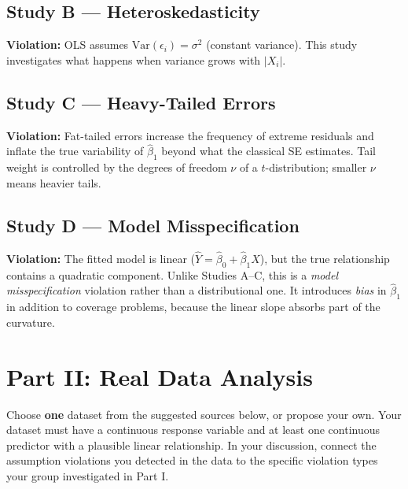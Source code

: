 \documentclass[12pt]{article}
\begin{document}
\subsection*{Study B --- Heteroskedasticity}

\textbf{Violation:} OLS assumes $\mathrm{Var}(\epsilon_i) = \sigma^2$ (constant variance). This study investigates what happens when variance grows with $|X_i|$.

\subsection*{Study C --- Heavy-Tailed Errors}

\textbf{Violation:} Fat-tailed errors increase the frequency of extreme residuals and inflate the true variability of $\hat{\beta}_1$ beyond what the classical SE estimates. Tail weight is controlled by the degrees of freedom $\nu$ of a $t$-distribution; smaller $\nu$ means heavier tails.

\subsection*{Study D --- Model Misspecification}

\textbf{Violation:} The fitted model is linear ($\hat{Y} = \hat{\beta}_0 + \hat{\beta}_1 X$), but the true relationship contains a quadratic component. Unlike Studies A--C, this is a \emph{model misspecification} violation rather than a distributional one. It introduces \emph{bias} in $\hat{\beta}_1$ in addition to coverage problems, because the linear slope absorbs part of the curvature.


\section*{Part II: Real Data Analysis}

Choose \textbf{one} dataset from the suggested sources below, or propose your own. Your dataset must have a continuous response variable and at least one continuous predictor with a plausible linear relationship. In your discussion, connect the assumption violations you detected in the data to the specific violation types your group investigated in Part I.
\end{document}

